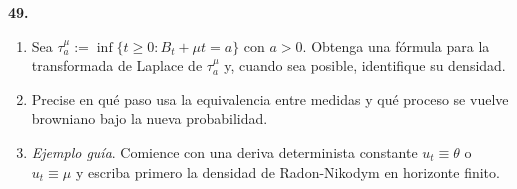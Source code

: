 \documentclass[11pt, letterpaper]{article}
\begin{document}
\begin{ejercicio}
    \textbf{49.} 
    \begin{enumerate}
        \item[(a)] Sea $\tau_a^\mu := \inf\{t \ge 0 : B_t + \mu t = a\}$ con $a > 0$. Obtenga una fórmula para la transformada de Laplace de $\tau_a^\mu$ y, cuando sea posible, identifique su densidad.
        \item[(b)] Precise en qué paso usa la equivalencia entre medidas y qué proceso se vuelve browniano bajo la nueva probabilidad.
        \item[(c)] \textit{Ejemplo guía}. Comience con una deriva determinista constante $u_t \equiv \theta$ o $u_t \equiv \mu$ y escriba primero la densidad de Radon-Nikodym en horizonte finito.
    \end{enumerate}
\end{ejercicio}

\vspace{5mm}
\end{document}
